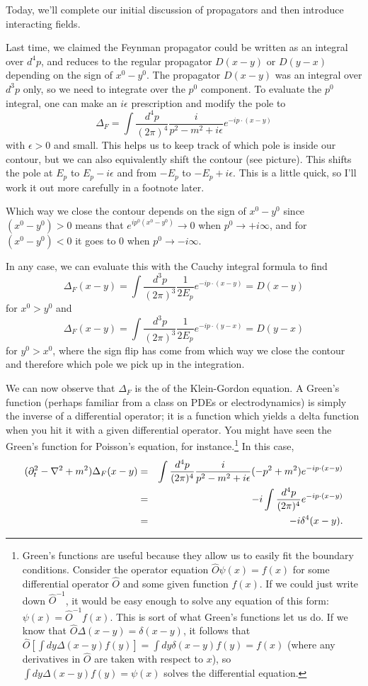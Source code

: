Today, we'll complete our initial discussion of propagators and then introduce interacting fields.

Last time, we claimed the Feynman propagator could be written as an integral over $d^4p$, and reduces to the regular propagator $D(x-y)$ or $D(y-x)$ depending on the sign of $x^0-y^0$. The propagator $D(x-y)$ was an integral over $d^3p$ only, so we need to integrate over the $p^0$ component. To evaluate the $p^0$ integral, one can make an $i\epsilon$ prescription and modify the pole to
$$\Delta_F=\int \frac{d^4p}{(2\pi)^4}\frac{i}{p^2-m^2+i\epsilon}e^{-ip\cdot (x-y)}$$
with $\epsilon>0$ and small. This helps us to keep track of which pole is inside our contour, but we can also equivalently shift the contour (see picture). This shifts the pole at $E_p$ to $E_p-i\epsilon$ and from $-E_p$ to $-E_p+i\epsilon$. This is a little quick, so I'll work it out more carefully in a footnote later.

Which way we close the contour depends on the sign of $x^0-y^0$ since $(x^0-y^0)>0$ means that $e^{ip^0 (x^0-y^0)}\to 0$ when $p^0\to +i\infty$, and for $(x^0-y^0)<0$ it goes to $0$ when $p^0\to -i\infty$.

In any case, we can evaluate this with the Cauchy integral formula to find
$$\Delta_F(x-y)=\int \frac{d^3p}{(2\pi)^3}\frac{1}{2E_p}e^{-ip\cdot (x-y)}=D(x-y)$$
for $x^0>y^0$ and 
$$\Delta_F(x-y)=\int \frac{d^3p}{(2\pi)^3}\frac{1}{2E_p}e^{-ip\cdot (y-x)}=D(y-x)$$ for $y^0>x^0$, where the sign flip has come from which way we close the contour and therefore which pole we pick up in the integration.

We can now observe that $\Delta_F$ is the  of the Klein-Gordon equation. A Green's function (perhaps familiar from a class on PDEs or electrodynamics) is simply the inverse of a differential operator; it is a function which yields a delta function when you hit it with a given differential operator. You might have seen the Green's function for Poisson's equation, for instance.\footnote{Green's functions are useful because they allow us to easily fit the boundary conditions. Consider the operator equation $\hat O \psi(x) = f(x)$ for some differential operator $\hat O$ and some given function $f(x)$. If we could just write down $\hat O^{-1}$, it would be easy enough to solve any equation of this form: $\psi(x)=\hat O^{-1} f(x)$. This is sort of what Green's functions let us do. If we know that $\hat O \Delta(x-y) = \delta(x-y)$, it follows that $\hat O \left[\int dy \Delta(x-y) f(y)\right]=\int dy \delta(x-y) f(y) = f(x)$ (where any derivatives in $\hat O$ are taken with respect to $x$), so $\int dy \Delta(x-y)f(y)=\psi(x)$ solves the differential equation.} In this case,
\begin{eqnarray*}
(\partial_t^2 -\nabla^2+m^2)\Delta_F(x-y)&=& \int \frac{d^4p}{(2\pi)^4}\frac{i}{p^2-m^2+i\epsilon}(-p^2+m^2) e^{-ip\cdot (x-y)}\\
&=&-i\int \frac{d^4p}{(2\pi)^4} e^{-ip\cdot (x-y)}\\
&=& -i \delta^4 (x-y).
\end{eqnarray*}

